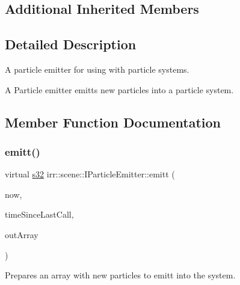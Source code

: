 \subsection*{Additional Inherited Members}


\subsection{Detailed Description}
A particle emitter for using with particle systems. 

A Particle emitter emitts new particles into a particle system. 

\subsection{Member Function Documentation}
\mbox{\label{classirr_1_1scene_1_1IParticleEmitter_aaf773f8ce5db3b5a2455561ef7818506}} 
\subsubsection{\texorpdfstring{emitt()}{emitt()}\hspace{0.1cm}{\footnotesize\ttfamily [1/2]}}
{\footnotesize\ttfamily virtual \hyperlink{namespaceirr_ac66849b7a6ed16e30ebede579f9b47c6}{s32} irr\+::scene\+::\+I\+Particle\+Emitter\+::emitt (\begin{DoxyParamCaption}\item[{\hyperlink{namespaceirr_a0416a53257075833e7002efd0a18e804}{u32}}]{now,  }\item[{\hyperlink{namespaceirr_a0416a53257075833e7002efd0a18e804}{u32}}]{time\+Since\+Last\+Call,  }\item[{\hyperlink{structirr_1_1scene_1_1SParticle}{S\+Particle} $\ast$\&}]{out\+Array }\end{DoxyParamCaption})\hspace{0.3cm}{\ttfamily [pure virtual]}}



Prepares an array with new particles to emitt into the system. 


